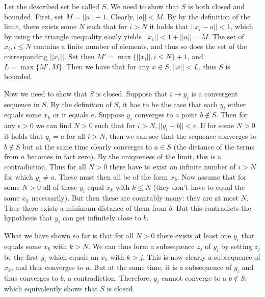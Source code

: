 \begin{solution}

    Let the described set be called $S$. We need to show that $S$ is both closed and bounded. First, set $M = \lvert \lvert a \rvert \rvert + 1$. Clearly, $\lvert a \rvert \rvert < M$. By by the definition of the limit, there exists some $N$ such that for $i > N$ it holds that $\lvert \lvert x_i - a \rvert \rvert < 1$, which by using the triangle inequality easily yields $\lvert \lvert x_i \rvert \rvert < 1 + \lvert \lvert a \rvert \rvert = M$. The set of $x_i, i \leq N$ contains a finite number of elements, and thus so does the set of the corresponding $\lvert \lvert x_i \rvert \rvert$. Set then $M' = \max\{\lvert \lvert x_i \rvert \rvert, i \leq N \} + 1$, and $L = \max\{M', M\}$. Then we have that for any $x \in S, \lvert \lvert x \rvert \rvert < L$, thus $S$ is bounded.

    Now we need to show that $S$ is closed. Suppose that $i \rightarrow y_i$ is a convergent sequence in $S$. By the definition of $S$, it has to be the case that each $y_i$ either equals some $x_k$ or it equals $a$. Suppose $y_i$ converges to a point $b \notin S$. Then for any $\epsilon > 0$ we can find $N > 0$ such that for $i > N, \lvert \lvert y_i - b \rvert \rvert < \epsilon$. If for some $N > 0$ it holds that $y_i = a$ for all $i > N$, then we can see that the sequence converges to $b \notin S$ but at the same time clearly converges to $a \in S$ (the distance of the terms from $a$ becomes in fact zero). By the uniqueness of the limit, this is a contradiction. Thus for all $N > 0$ there have to exist an infinite number of $i > N$ for which $y_i \neq a$. These must then all be of the form $x_k$. Now assume that for some $N > 0$ all of these $y_i$ equal $x_k$ with $k \leq N$ (they don't have to equal the same $x_k$ necessarily). But then these are countably many: they are at most $N$. Thus there exists a minimum distance of them from $b$. But this contradicts the hypothesis that $y_i$ can get infinitely close to $b$.

    What we have shown so far is that for all $N > 0$ there exists at least one $y_i$ that equals some $x_k$ with $k > N$. We can thus form a subsequence $z_j$ of $y_i$ by setting $z_j$ be the first $y_i$ which equals an $x_k$ with $k > j$. This is now clearly a subsequence of $x_k$, and thus converges to $a$. But at the same time, it is a subsequence of $y_i$ and thus converges to $b$, a contradiction. Therefore, $y_i$ cannot converge to a $b \notin S$, which equivalently shows that $S$ is closed.
\end{solution}

